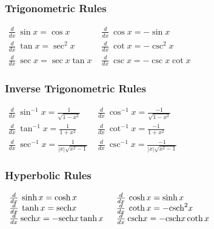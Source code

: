 \documentclass[10pt,letterpaper]{article}
\begin{document}
\begin{multicols}{2}
															\subsubsection*{Trigonometric Rules}

$ \begin{array}{ll}
   \frac{d}{dx}\: \sin x = \cos x \\
   \frac{d}{dx}\: \tan x = \sec ^{2} x \\
   \frac{d}{dx}\: \sec x = \sec x \tan x
  \end{array} $ \hfill
$ \begin{array}{ll}
   \frac{d}{dx}\: \cos x = -\sin x \\
   \frac{d}{dx}\: \cot x = -\csc ^{2} x \\
   \frac{d}{dx}\: \csc x = -\csc x \cot x
  \end{array} $

															\subsubsection*{Inverse Trigonometric Rules}

$ \begin{array}{ll}
   \frac{d}{dx}\: \sin ^{-1} x = \frac{1}{\sqrt{1 - x ^{2} }} \\
   \frac{d}{dx}\: \tan ^{-1} x = \frac{1}{1 + x ^ {2}} \\
   \frac{d}{dx}\: \sec ^{-1} x = \frac{1}{|x|\sqrt{x^{2}-1}}
  \end{array} $ \hfill
$ \begin{array}{ll}
   \frac{d}{dx}\: \cos ^{-1} x = \frac{-1}{\sqrt{1 - x ^{2} }} \\
   \frac{d}{dx}\: \cot ^{-1} x = \frac{-1}{1 + x ^ {2}} \\
   \frac{d}{dx}\: \csc ^{-1} x = \frac{-1}{|x|\sqrt{x^{2}-1}}
  \end{array} $

															\subsubsection*{Hyperbolic Rules}

$ \begin{array}{ll}
   \frac{d}{dx}\: \sinh x = \cosh x \\
   \frac{d}{dx}\: \tanh x = \text{sech} x \\
   \frac{d}{dx}\: \text{sech} x = -\text{sech} x \tanh x
  \end{array} $ \hfill
$ \begin{array}{ll}
   \frac{d}{dx}\: \cosh x = \sinh x \\
   \frac{d}{dx}\: \coth x = -\text{csch} ^{2} x \\
   \frac{d}{dx}\: \text{csch} x = -\text{csch} x \coth x
  \end{array} $


\end{multicols}
\end{document}
